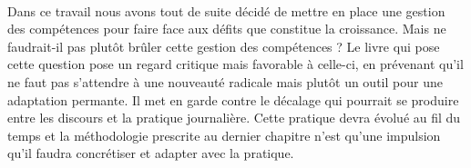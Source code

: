 \paragraph{} Dans ce travail nous avons tout de suite décidé de mettre en place une gestion des compétences pour faire face aux défits que constitue la croissance. Mais ne faudrait-il pas plutôt brûler cette gestion des compétences ? Le livre \citep[pp.253]{competencesbruler2006} qui pose cette question pose un regard critique mais favorable à celle-ci, en prévenant qu'il ne faut pas s'attendre à une nouveauté radicale mais plutôt un outil pour une adaptation permante. Il met en garde contre le décalage qui pourrait se produire entre les discours et la pratique journalière. Cette pratique devra évolué au fil du temps et la méthodologie prescrite au dernier chapitre n'est qu'une impulsion qu'il faudra concrétiser et adapter avec la pratique.   
